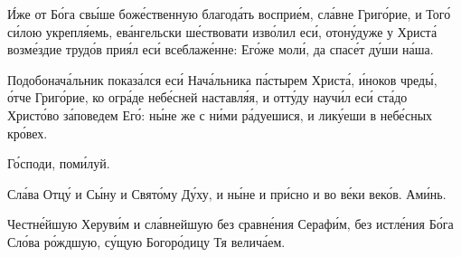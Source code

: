 \begin{mymulticols}


\'{И}же от Б\'{о}га св\'{ы}ше бож\'{е}ственную благод\'{а}ть воспри\'{е}м, сл\'{а}вне Григ\'{о}рие, и Тог\'{о} с\'{и}лою укрепл\'{я}емь, ев\'{а}нгельски ш\'{е}ствовати изв\'{о}лил ес\'{и}, отон\'{у}дуже у Христ\'{а} возм\'{е}здие труд\'{о}в при\'{я}л ес\'{и} всеблаж\'{е}нне: Ег\'{о}же мол\'{и}, да спас\'{е}т д\'{у}ши н\'{а}ша.

\vspace{-\baselineskip}

\slava

\ifpdf
    \begin{small}
\else
\fi

Подобонач\'{а}льник показ\'{а}лся ес\'{и} Нач\'{а}льника п\'{а}стырем Христ\'{а}, \'{и}ноков чред\'{ы}, \'{о}тче Григ\'{о}рие, ко огр\'{а}де неб\'{е}сней наставл\'{я}я, и отт\'{у}ду науч\'{и}л ес\'{и} ст\'{а}до Христ\'{о}во з\'{а}поведем Ег\'{о}: н\'{ы}не же с н\'{и}ми р\'{а}дуешися, и лик\'{у}еши в неб\'{е}сных кр\'{о}вех.

\ifpdf
    \end{small}
\else
\fi

\inyne

\Bogorodichen{\Predstatelstvo}

Г\'{о}споди, пом\'{и}луй. 

Сл\'{а}ва Отц\'{у} и С\'{ы}ну и Свят\'{о}му Д\'{у}ху, и н\'{ы}не и пр\'{и}сно и во в\'{е}ки век\'{о}в. Ам\'{и}нь.

Честн\'{е}йшую Херув\'{и}м и сл\'{а}внейшую без сравн\'{е}ния Сераф\'{и}м, без истл\'{е}ния Б\'{о}га Сл\'{о}ва р\'{о}ждшую, с\'{у}щую Богор\'{о}дицу Тя велич\'{а}ем.


\end{mymulticols}

\mychapterending

\begin{mymulticols}

\SymbolOfFaith

\end{mymulticols}

\mychapterending

